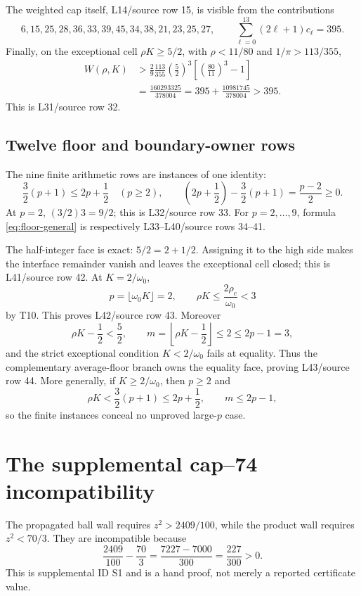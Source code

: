 \documentclass[11pt]{article}
\newcommand{\om}{\omega _0}
\newcommand{\rc}{\rho _c}
\begin{document}
The weighted cap itself, L14/source row 15, is visible from the contributions
\[
 6,15,25,28,36,33,39,45,34,38,21,23,25,27,
 \qquad \sum_{\ell=0}^{13}(2\ell+1)c_\ell=395.
\]
Finally, on the exceptional cell \(\rho K\ge5/2\), with
\(\rho<11/80\) and \(1/\pi>113/355\),
\begin{align*}
 W(\rho,K)
 &>\frac{2}{9}\frac{113}{355}\left(\frac52\right)^3
 \left[\left(\frac{80}{11}\right)^3-1\right]\\
 &=\frac{160293325}{378004}
 =395+\frac{10981745}{378004}>395.
\end{align*}
This is L31/source row 32.

\subsection{Twelve floor and boundary-owner rows}

The nine finite arithmetic rows are instances of one identity:
\begin{equation}
 \frac32(p+1)\le 2p+\frac12
 \quad(p\ge2),\qquad
 \left(2p+\frac12\right)-\frac32(p+1)=\frac{p-2}{2}\ge0.
 \label{eq:floor-general}
\end{equation}
At \(p=2\), \((3/2)3=9/2\); this is L32/source row 33.
For \(p=2,\ldots,9\), formula \eqref{eq:floor-general} is respectively
L33--L40/source rows 34--41.

The half-integer face is exact:
\(5/2=2+1/2\).  Assigning it to the high side makes the interface
remainder vanish and leaves the exceptional cell closed; this is
L41/source row 42.  At \(K=2/\om\),
\[
 p=\lfloor\om K\rfloor=2,
 \qquad \rho K\le\frac{2\rc}{\om}<3
\]
by T10.  This proves L42/source row 43.  Moreover
\[
 \rho K-\frac12<\frac52,\qquad
 m=\left\lfloor\rho K-\frac12\right\rfloor\le2
 \le 2p-1=3,
\]
and the strict exceptional condition \(K<2/\om\) fails at equality.
Thus the complementary average-floor branch owns the equality face,
proving L43/source row 44.
More generally, if \(K\ge2/\om\), then \(p\ge2\) and
\[
 \rho K<\frac32(p+1)\le2p+\frac12,
 \qquad m\le2p-1,
\]
so the finite instances conceal no unproved large-\(p\) case.

\section{The supplemental cap--74 incompatibility}

The propagated ball wall requires \(z^2>2409/100\), while the product
wall requires \(z^2<70/3\).  They are incompatible because
\[
 \frac{2409}{100}-\frac{70}{3}
 =\frac{7227-7000}{300}=\frac{227}{300}>0.
\]
This is supplemental ID S1 and is a hand proof, not merely a reported
certificate value.
\end{document}
